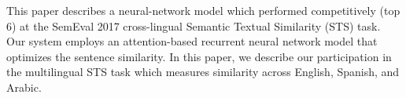 This paper describes a neural-network model which performed competitively (top 6) at the SemEval 2017 cross-lingual Semantic Textual Similarity (STS) task. Our system employs an attention-based recurrent neural network model that optimizes the sentence similarity. In this paper, we describe our participation in the multilingual STS task which measures similarity across English, Spanish, and Arabic.
